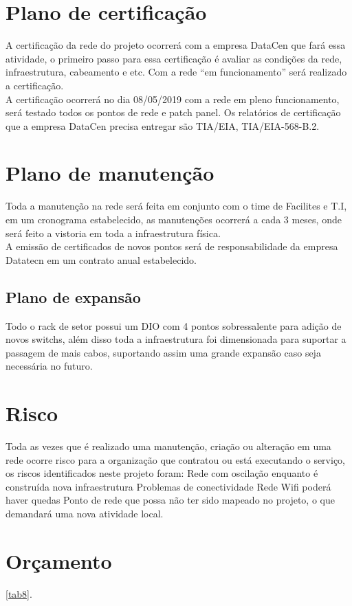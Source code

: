 \documentclass[	DIV=calc,%
							paper=a4,%
							fontsize=12pt,%
							onecolumn]{scrartcl}	 					%
\begin{document}
\section{Plano de certificação}
A certificação da rede do projeto ocorrerá com a empresa DataCen que fará essa atividade, o primeiro passo para essa certificação é avaliar as condições da rede, infraestrutura, cabeamento e etc. Com a rede “em funcionamento” será realizado a certificação.\\ 
A certificação ocorrerá no dia 08/05/2019 com a rede em pleno funcionamento, será testado todos os pontos de rede e patch panel. 
Os relatórios de certificação que a empresa DataCen precisa entregar são TIA/EIA, TIA/EIA-568-B.2. 


\section{Plano de manutenção}

Toda a manutenção na rede será feita em conjunto com o time de Facilites e T.I, em um cronograma estabelecido, as manutenções ocorrerá a cada 3 meses, onde será feito a vistoria em toda a infraestrutura física. \\
A emissão de certificados de novos pontos será de responsabilidade da empresa Datatecn em um contrato anual estabelecido.

\subsection{Plano de expansão}
Todo o rack de setor possui um DIO com 4 pontos sobressalente para adição de novos switchs, além disso toda a infraestrutura foi dimensionada para suportar a passagem de mais cabos, suportando assim uma grande expansão caso seja necessária no futuro.

\section{Risco}
Toda as vezes que é realizado uma manutenção, criação ou alteração em uma rede ocorre risco para a organização que contratou ou está executando o serviço, os riscos identificados neste projeto foram:
Rede com oscilação enquanto é construída nova infraestrutura
Problemas de conectividade
Rede Wifi poderá haver quedas
Ponto de rede que possa não ter sido mapeado no projeto, o que demandará uma nova atividade local.

\section{Orçamento}
\ref{tab8}.

\end{document}
